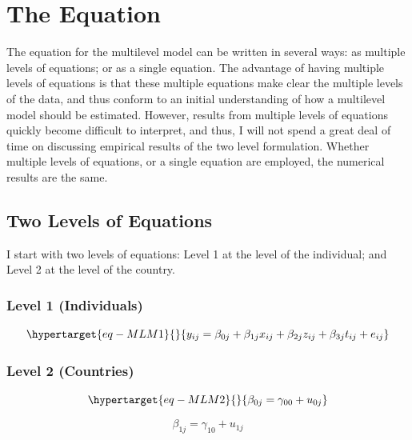 \documentclass[
  letterpaper,
  DIV=11,
  numbers=noendperiod]{scrreprt}
\begin{document}
\hypertarget{the-equation}{%
\section{The Equation}\label{the-equation}}

The equation for the multilevel model can be written in several ways: as
multiple levels of equations; or as a single equation. The advantage of
having multiple levels of equations is that these multiple equations
make clear the multiple levels of the data, and thus conform to an
initial understanding of how a multilevel model should be estimated.
However, results from multiple levels of equations quickly become
difficult to interpret, and thus, I will not spend a great deal of time
on discussing empirical results of the two level formulation. Whether
multiple levels of equations, or a single equation are employed, the
numerical results are the same.

\hypertarget{two-levels-of-equations}{%
\subsection{Two Levels of Equations}\label{two-levels-of-equations}}

I start with two levels of equations: Level 1 at the level of the
individual; and Level 2 at the level of the country.

\hypertarget{level-1-individuals}{%
\subsubsection{Level 1 (Individuals)}\label{level-1-individuals}}

\begin{equation}\protect\hypertarget{eq-MLM1}{}{y_{ij} = \beta_{0j} + \beta_{1j} x_{ij} + \beta_{2j} z_{ij} + \beta_{3j} t_{ij} + e_{ij}}\label{eq-MLM1}\end{equation}

\hypertarget{level-2-countries}{%
\subsubsection{Level 2 (Countries)}\label{level-2-countries}}

\begin{equation}\protect\hypertarget{eq-MLM2}{}{\beta_{0j} = \gamma_{00} + u_{0j}}\label{eq-MLM2}\end{equation}

\[\beta_{1j} = \gamma_{10} + u_{1j}\]
\end{document}
